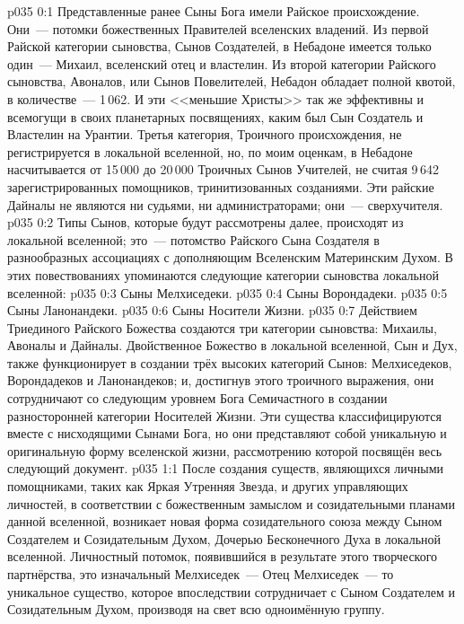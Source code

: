 \author{Глава Архангелов}
\vs p035 0:1 Представленные ранее Сыны Бога имели Райское происхождение. Они~--- потомки божественных Правителей вселенских владений. Из первой Райской категории сыновства, Сынов Создателей, в Небадоне имеется только один~--- Михаил, вселенский отец и властелин. Из второй категории Райского сыновства, Авоналов, или Сынов Повелителей, Небадон обладает полной квотой, в количестве~--- 1\,062. И эти <<меньшие Христы>> так же эффективны и всемогущи в своих планетарных посвящениях, каким был Сын Создатель и Властелин на Урантии. Третья категория, Троичного происхождения, не регистрируется в локальной вселенной, но, по моим оценкам, в Небадоне насчитывается от 15\,000 до 20\,000 Троичных Сынов Учителей, не считая 9\,642 зарегистрированных помощников, тринитизованных созданиями. Эти райские Дайналы не являются ни судьями, ни администраторами; они~--- сверхучителя.
\vs p035 0:2 Типы Сынов, которые будут рассмотрены далее, происходят из локальной вселенной; это~--- потомство Райского Сына Создателя в разнообразных ассоциациях с дополняющим Вселенским Материнским Духом. В этих повествованиях упоминаются следующие категории сыновства локальной вселенной:
\vs p035 0:3 Сыны Мелхиседеки.
\vs p035 0:4 Сыны Ворондадеки.
\vs p035 0:5 Сыны Ланонандеки.
\vs p035 0:6 Сыны Носители Жизни.
\vs p035 0:7 \pc Действием Триединого Райского Божества создаются три категории сыновства: Михаилы, Авоналы и Дайналы. Двойственное Божество в локальной вселенной, Сын и Дух, также функционирует в создании трёх высоких категорий Сынов: Мелхиседеков, Ворондадеков и Ланонандеков; и, достигнув этого троичного выражения, они сотрудничают со следующим уровнем Бога Семичастного в создании разносторонней категории Носителей Жизни. Эти существа классифицируются вместе с нисходящими Сынами Бога, но они представляют собой уникальную и оригинальную форму вселенской жизни, рассмотрению которой посвящён весь следующий документ.
\vs p035 1:1 После создания существ, являющихся личными помощниками, таких как Яркая Утренняя Звезда, и других управляющих личностей, в соответствии с божественным замыслом и созидательными планами данной вселенной, возникает новая форма созидательного союза между Сыном Создателем и Созидательным Духом, Дочерью Бесконечного Духа в локальной вселенной. Личностный потомок, появившийся в результате этого творческого партнёрства, это изначальный Мелхиседек~--- Отец Мелхиседек~--- то уникальное существо, которое впоследствии сотрудничает с Сыном Создателем и Созидательным Духом, производя на свет всю одноимённую группу.
